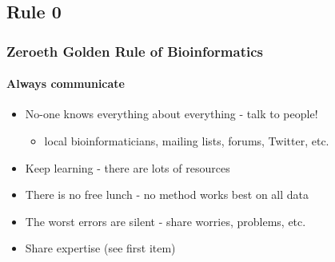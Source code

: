 %

\subsection{Rule 0}
\begin{frame}
  \frametitle{Zeroeth Golden Rule of Bioinformatics}
  \framesubtitle{Always communicate}
  \begin{itemize}
    \item No-one knows everything about everything - talk to people!
    \begin{itemize}
      \item local bioinformaticians, mailing lists, forums, Twitter, etc.
    \end{itemize}
    \item Keep learning - there are lots of resources
    \item There is no free lunch - no method works best on all data
    \item The worst errors are silent - share worries, problems, etc.
    \item Share expertise (see first item)
  \end{itemize}
\end{frame}

